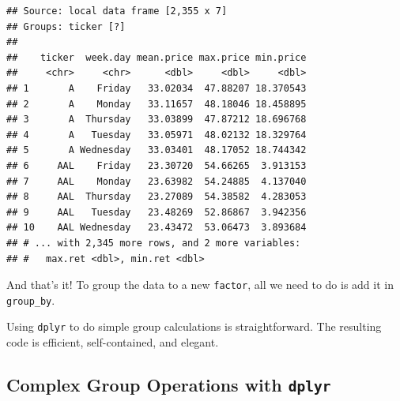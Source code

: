 \documentclass[11pt,]{book}
\newenvironment{Shaded}{\begin{snugshade}}{\end{snugshade}}
\newcommand{\KeywordTok}[1]{\textcolor[rgb]{0.27,0.27,0.27}{\textbf{#1}}}
\newcommand{\DataTypeTok}[1]{\textcolor[rgb]{0.27,0.27,0.27}{#1}}
\newcommand{\StringTok}[1]{\textcolor[rgb]{0.5,0.5,0.5}{#1}}
\newcommand{\CommentTok}[1]{\textcolor[rgb]{0.56,0.35,0.01}{\textit{#1}}}
\newcommand{\OperatorTok}[1]{\textcolor[rgb]{0.81,0.36,0.00}{\textbf{#1}}}
\newcommand{\NormalTok}[1]{#1}
\begin{document}
\begin{Shaded}
\end{Shaded}

\begin{verbatim}
## Source: local data frame [2,355 x 7]
## Groups: ticker [?]
## 
##    ticker  week.day mean.price max.price min.price
##     <chr>     <chr>      <dbl>     <dbl>     <dbl>
## 1       A    Friday   33.02034  47.88207 18.370543
## 2       A    Monday   33.11657  48.18046 18.458895
## 3       A  Thursday   33.03899  47.87212 18.696768
## 4       A   Tuesday   33.05971  48.02132 18.329764
## 5       A Wednesday   33.03401  48.17052 18.744342
## 6     AAL    Friday   23.30720  54.66265  3.913153
## 7     AAL    Monday   23.63982  54.24885  4.137040
## 8     AAL  Thursday   23.27089  54.38582  4.283053
## 9     AAL   Tuesday   23.48269  52.86867  3.942356
## 10    AAL Wednesday   23.43472  53.06473  3.893684
## # ... with 2,345 more rows, and 2 more variables:
## #   max.ret <dbl>, min.ret <dbl>
\end{verbatim}

And that's it! To group the data to a new \texttt{factor}, all we need
to do is add it in \texttt{group\_by}.

Using \texttt{dplyr} to do simple group calculations is straightforward.
The resulting code is efficient, self-contained, and elegant.

\subsection{\texorpdfstring{Complex Group Operations with
\texttt{dplyr}}{Complex Group Operations with dplyr}}\label{complex-group-operations-with-dplyr}
\end{document}
